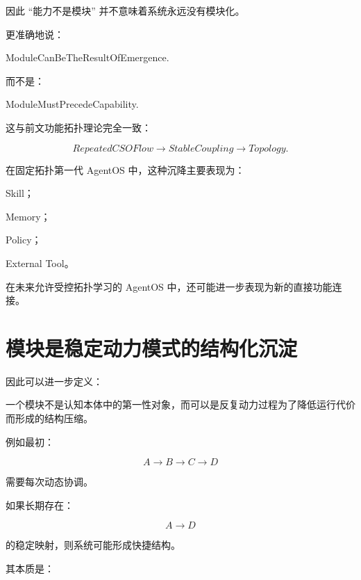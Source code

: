 因此 ``能力不是模块'' 并不意味着系统永远没有模块化。

更准确地说：

\begin{statementbox}
ModuleCanBeTheResultOfEmergence.
\end{statementbox}

而不是：

\begin{statementbox}
ModuleMustPrecedeCapability.
\end{statementbox}

这与前文功能拓扑理论完全一致：

\[
RepeatedCSOFlow
\rightarrow
StableCoupling
\rightarrow
Topology.
\]

在固定拓扑第一代 AgentOS 中，这种沉降主要表现为：

Skill；

Memory；

Policy；

External Tool。

在未来允许受控拓扑学习的 AgentOS 中，还可能进一步表现为新的直接功能连接。

\section{模块是稳定动力模式的结构化沉淀}

因此可以进一步定义：

\begin{statementbox}
\centering
{}
\end{statementbox}

一个模块不是认知本体中的第一性对象，而可以是反复动力过程为了降低运行代价而形成的结构压缩。

例如最初：

\[
A
\rightarrow
B
\rightarrow
C
\rightarrow
D
\]

需要每次动态协调。

如果长期存在：

\[
A\rightarrow D
\]

的稳定映射，则系统可能形成快捷结构。

其本质是：

\begin{statementbox}
\centering
{}
\end{statementbox}

